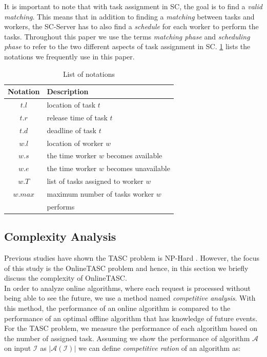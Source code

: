 It is important to note that with task assignment in SC, the goal is to find a \textit{valid matching}. This means that in addition to finding a \textit{matching} between tasks and workers, the SC-Server has to also find a \textit{schedule} for each worker to perform the tasks. Throughout this paper we use the terms \textit{matching phase} and \textit{scheduling phase} to refer to the two different aspects of task assignment in SC. \cref{tab:notation} lists the notations we frequently use in this paper.\\

\begin{table}
\begin{center}
\begin{tabular}{| c | l |} \hline
Notation	&	Description \\ \hline
$t.l$		&	location of task $t$ \\ \hline
$t.r$		&	release time of task $t$ \\ \hline
$t.d$		& 	deadline of task $t$ \\ \hline
$w.l$		&	location of worker $w$ \\ \hline
$w.s$		&	the time worker $w$ becomes available \\ \hline
$w.e$		&	the time worker $w$ becomes unavailable \\ \hline
$w.T$		&	list of tasks assigned to worker $w$ \\ \hline
$w.max$		&	maximum number of tasks worker $w$ \\
			&	performs \\ \hline
\end{tabular}
\caption{List of notations}
\label{tab:notation}
\end{center}
\end{table}

\subsection{Complexity Analysis}

Previous studies have shown the TASC problem is NP-Hard \cite{Kazemi13, Deng15}. However, the focus of this study is the OnlineTASC problem and hence, in this section we briefly discuss the complexity of OnlineTASC.\\

In order to analyze online algorithms, where each request is processed without being able to see the future, we use a method named \textit{competitive analysis}\cite{Sleator85}. With this method, the performance of an online algorithm is compared to the performance of an optimal offline algorithm that has knowledge of future events. For the TASC problem, we measure the performance of each algorithm based on the number of assigned task. Assuming we show the performance of algorithm $\mathcal{A}$ on input $\mathcal{I}$ as $\vert \mathcal{A}\left( \mathcal{I} \right) \vert$ we can define \textit{competitive ration} of an algorithm as:

